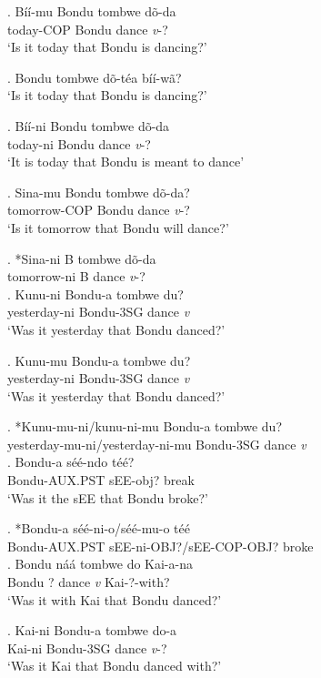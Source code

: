 \documentclass{assets/fieldnotes}
\begin{document}
\exg. Bíí-mu Bondu tombwe dõ-da\\
today-COP Bondu dance \textit{v}-?\\
`Is it today that Bondu is dancing?'

\exg. Bondu tombwe dõ-téa bíí-wã?\\

`Is it today that Bondu is dancing?' 

\exg. Bíí-ni Bondu tombwe dõ-da\\
today-ni Bondu dance \textit{v}-?\\
`It is today that Bondu is meant to dance'

\exg. Sina-mu Bondu tombwe dõ-da?\\
tomorrow-COP Bondu dance \textit{v}-?\\
`Is it tomorrow that Bondu will dance?'

\exg. *Sina-ni B tombwe dõ-da\\
tomorrow-ni B dance \textit{v}-?\\

\exg. Kunu-ni Bondu-a tombwe du?\\
yesterday-ni Bondu-3SG dance \textit{v}\\
`Was it yesterday that Bondu danced?'

\exg. Kunu-mu Bondu-a tombwe du?\\
yesterday-ni Bondu-3SG dance \textit{v}\\
`Was it yesterday that Bondu danced?'

\exg. *Kunu-mu-ni/kunu-ni-mu Bondu-a tombwe du?\\
yesterday-mu-ni/yesterday-ni-mu Bondu-3SG dance \textit{v}\\

\exg. Bondu-a séé-ndo téé?\\
Bondu-AUX.PST sEE-obj? break\\
`Was it the sEE that Bondu broke?'

\exg. *Bondu-a séé-ni-o/séé-mu-o téé\\
Bondu-AUX.PST sEE-ni-OBJ?/sEE-COP-OBJ? broke\\

\exg. Bondu náá tombwe do Kai-a-na\\
Bondu ? dance \textit{v} Kai-?-with?\\
`Was it with Kai that Bondu danced?'

\exg. Kai-ni Bondu-a tombwe do-a\\
Kai-ni Bondu-3SG dance \textit{v}-?\\
`Was it Kai that Bondu danced with?'
\end{document}
